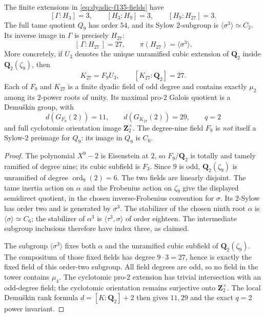 \begin{theorem}
\label{thm:dyadic-f135-actual-27-sylow-field}
The finite extensions in
\eqref{eq:dyadic-f135-fields}
have
\begin{equation}\label{eq:dyadic-f135-odd-field-degrees}
[\Gamma:H_3]=3,\qquad
[H_3:H_9]=3,\qquad
[H_9:H_{27}]=3.
\end{equation}
The full tame quotient $Q_9$
has order $54$, and its
Sylow $2$-subgroup is
$\langle\sigma^3\rangle\simeq C_2$.
Its inverse image in $\Gamma$
is precisely $H_{27}$:
\begin{equation}\label{eq:dyadic-f135-sylow-preimage-27}
\boxed{\quad
[\,\Gamma:H_{27}\,]=27,\qquad
\pi(H_{27})=\langle\sigma^3\rangle.
\quad}
\end{equation}
More concretely, if $U_3$
denotes the unique unramified
cubic extension of $\mathbf Q_2$
inside $\mathbf Q_2(\zeta_9)$,
then
\[
K_{27}=F_9U_3,
\qquad [K_{27}:\mathbf Q_2]=27.
\]
Each of $F_9$ and $K_{27}$
is a finite dyadic field of
odd degree and contains
exactly $\mu_2$ among
its $2$-power roots of unity.
Its maximal pro-$2$
Galois quotient is a
Demu\v{s}kin group, with
\begin{equation}\label{eq:dyadic-f135-demushkin-odd-ranks}
\boxed{
d(G_{F_9}(2))=11,\qquad
d(G_{K_{27}}(2))=29,\qquad
q=2
}
\end{equation}
and full cyclotomic orientation
image $\mathbf Z_2^\times$.
The degree-nine field
$F_9$ is \emph{not}
itself a Sylow-$2$
preimage for $Q_9$:
its image in $Q_9$
is $C_6$.
\end{theorem}

\begin{proof}
The polynomial $X^9-2$
is Eisenstein at $2$,
so $F_9/\mathbf Q_2$
is totally and tamely
ramified of degree nine;
its cubic subfield is
$F_3$.
Since $9$ is odd,
$\mathbf Q_2(\zeta_9)$
is unramified of degree
$\operatorname{ord}_9(2)=6$.
The two fields are linearly
disjoint.
The tame inertia action on
$\alpha$ and the Frobenius
action on $\zeta_9$ give
the displayed semidirect
quotient, in the chosen
inverse-Frobenius convention
for $\sigma$.
Its $2$-Sylow has order
two and is generated by
$\sigma^3$.
The stabilizer of the
chosen ninth root
$\alpha$ is
$\langle\sigma\rangle
\simeq C_6$;
the stabilizer of
$\alpha^3$ is
$\langle\tau^3,\sigma\rangle$
of order eighteen.
The intermediate
subgroup inclusions
therefore have index
three, as claimed.

The subgroup
$\langle\sigma^3\rangle$
fixes both $\alpha$
and the unramified
cubic subfield of
$\mathbf Q_2(\zeta_9)$.
The compositum of
those fixed fields
has degree $9\cdot3=27$,
hence is exactly the
fixed field of this
order-two subgroup.
All field degrees
are odd, so no field
in the tower contains
$\mu_4$.
The cyclotomic pro-$2$
extension has trivial
intersection with an
odd-degree field;
the cyclotomic
orientation remains
surjective onto
$\mathbf Z_2^\times$.
The local Demu\v{s}kin
rank formula
$d=[K:\mathbf Q_2]+2$
then gives $11,29$
and the exact $q=2$
power invariant.
\end{proof}

